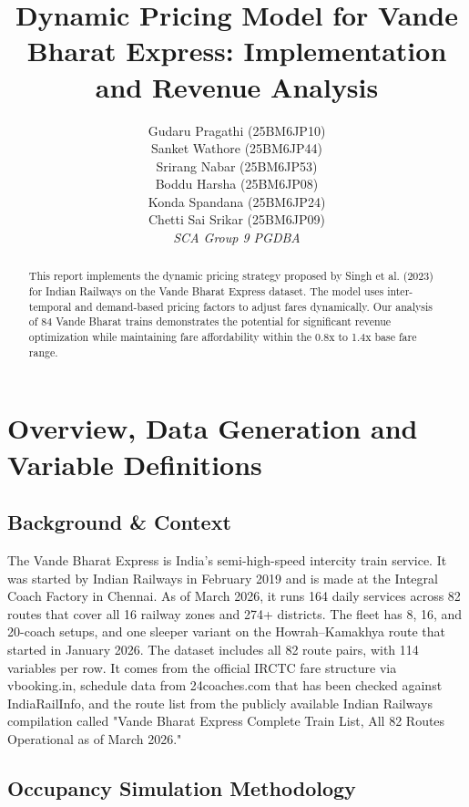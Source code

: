 \documentclass[10pt,a4paper]{article}
\title{\textbf{Dynamic Pricing Model for Vande Bharat Express: Implementation and Revenue Analysis}}
\author{\begin{tabular}{c}
Gudaru Pragathi (25BM6JP10) \\ 
Sanket Wathore (25BM6JP44) \\ 
Srirang Nabar (25BM6JP53) \\ 
Boddu Harsha (25BM6JP08) \\ 
Konda Spandana (25BM6JP24) \\ 
Chetti Sai Srikar (25BM6JP09) \\
\textit{SCA Group 9 PGDBA}
\end{tabular}}
\date{}
\begin{document}
\maketitle

\begin{abstract}
This report implements the dynamic pricing strategy proposed by Singh et al. (2023) for Indian Railways on the Vande Bharat Express dataset. The model uses inter-temporal and demand-based pricing factors to adjust fares dynamically. Our analysis of 84 Vande Bharat trains demonstrates the potential for significant revenue optimization while maintaining fare affordability within the 0.8x to 1.4x base fare range.
\end{abstract}

\section{Overview, Data Generation and Variable Definitions}

\subsection{Background \& Context}

The Vande Bharat Express is India's semi-high-speed intercity train service. It was started by
Indian Railways in February 2019 and is made at the Integral Coach Factory in Chennai. As of
March 2026, it runs 164 daily services across 82 routes that cover all 16 railway zones and
274+ districts. The fleet has 8, 16, and 20-coach setups, and one sleeper variant on the
Howrah–Kamakhya route that started in January 2026. The dataset includes all 82 route pairs,
with 114 variables per row. It comes from the official IRCTC fare structure via vbooking.in,
schedule data from 24coaches.com that has been checked against IndiaRailInfo, and the route
list from the publicly available Indian Railways compilation called "Vande Bharat Express
Complete Train List, All 82 Routes Operational as of March 2026."

\subsection{Occupancy Simulation Methodology}
\end{document}
